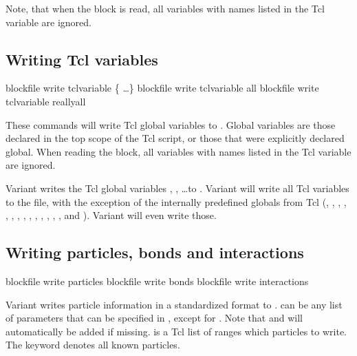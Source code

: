 Note, that when the block is read, all variables with names listed in
the Tcl variable  are ignored.

\subsection{Writing Tcl variables}

\begin{essyntax}
   blockfile  write tclvariable \{
    \dots \}
   blockfile  write tclvariable all
   blockfile  write tclvariable reallyall
\end{essyntax}

These commands will write Tcl global variables to .
Global variables are those declared in the top scope of the Tcl
script, or those that were explicitly declared global.  When reading
the block, all variables with names listed in the Tcl variable
 are ignored.

Variant  writes the Tcl global variables ,
, \dots to . Variant  will write
all Tcl variables to the file, with the exception of the internally
predefined globals from Tcl (, ,
, , , ,
, , , ,
, , , ,
 and ). Variant  will
even write those.

\subsection{Writing particles, bonds and interactions}
\begin{essyntax}
   blockfile  write particles 
   
   blockfile  write bonds 
   blockfile  write interactions
\end{essyntax}

  Variant  writes
particle information in a standardized format to .
 can be any list of parameters that can be specified in
, except for .  Note that
 and  will automatically be added if missing.
 is a Tcl list of ranges which particles to write.  The
keyword  denotes all known particles.

